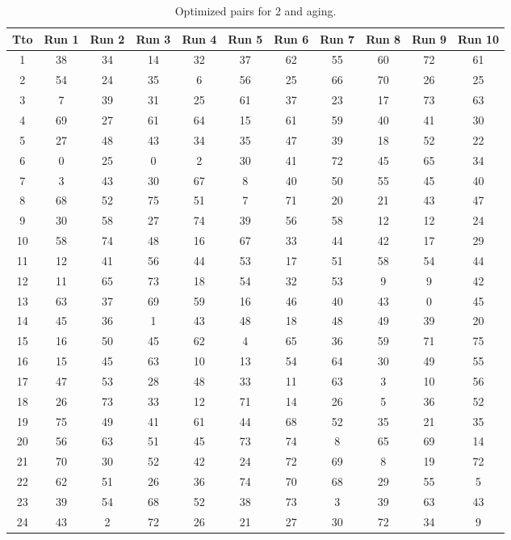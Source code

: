 \begin{table}
  \centering
  \scriptsize
  \caption{Optimized pairs for 2 and aging.}
  \label{tab_pairs}
\begin{tabular}{c c c c c c c c c c c }
\hline
Tto & Run 1 & Run 2 & Run 3 & Run 4 & Run 5 & Run 6 & Run 7 & Run 8 & Run 9 & Run 10 \\
\hline
1 & 38 & 34 & 14 & 32 & 37 & 62 & 55 & 60 & 72 & 61 \\
2 & 54 & 24 & 35 & 6 & 56 & 25 & 66 & 70 & 26 & 25 \\
3 & 7 & 39 & 31 & 25 & 61 & 37 & 23 & 17 & 73 & 63 \\
4 & 69 & 27 & 61 & 64 & 15 & 61 & 59 & 40 & 41 & 30 \\
5 & 27 & 48 & 43 & 34 & 35 & 47 & 39 & 18 & 52 & 22 \\
6 & 0 & 25 & 0 & 2 & 30 & 41 & 72 & 45 & 65 & 34 \\
7 & 3 & 43 & 30 & 67 & 8 & 40 & 50 & 55 & 45 & 40 \\
8 & 68 & 52 & 75 & 51 & 7 & 71 & 20 & 21 & 43 & 47 \\
9 & 30 & 58 & 27 & 74 & 39 & 56 & 58 & 12 & 12 & 24 \\
10 & 58 & 74 & 48 & 16 & 67 & 33 & 44 & 42 & 17 & 29 \\
11 & 12 & 41 & 56 & 44 & 53 & 17 & 51 & 58 & 54 & 44 \\
12 & 11 & 65 & 73 & 18 & 54 & 32 & 53 & 9 & 9 & 42 \\
13 & 63 & 37 & 69 & 59 & 16 & 46 & 40 & 43 & 0 & 45 \\
14 & 45 & 36 & 1 & 43 & 48 & 18 & 48 & 49 & 39 & 20 \\
15 & 16 & 50 & 45 & 62 & 4 & 65 & 36 & 59 & 71 & 75 \\
16 & 15 & 45 & 63 & 10 & 13 & 54 & 64 & 30 & 49 & 55 \\
17 & 47 & 53 & 28 & 48 & 33 & 11 & 63 & 3 & 10 & 56 \\
18 & 26 & 73 & 33 & 12 & 71 & 14 & 26 & 5 & 36 & 52 \\
19 & 75 & 49 & 41 & 61 & 44 & 68 & 52 & 35 & 21 & 35 \\
20 & 56 & 63 & 51 & 45 & 73 & 74 & 8 & 65 & 69 & 14 \\
21 & 70 & 30 & 52 & 42 & 24 & 72 & 69 & 8 & 19 & 72 \\
22 & 62 & 51 & 26 & 36 & 74 & 70 & 68 & 29 & 55 & 5 \\
23 & 39 & 54 & 68 & 52 & 38 & 73 & 3 & 39 & 63 & 43 \\
24 & 43 & 2 & 72 & 26 & 21 & 27 & 30 & 72 & 34 & 9 \\

\end{tabular}
\end{table}
